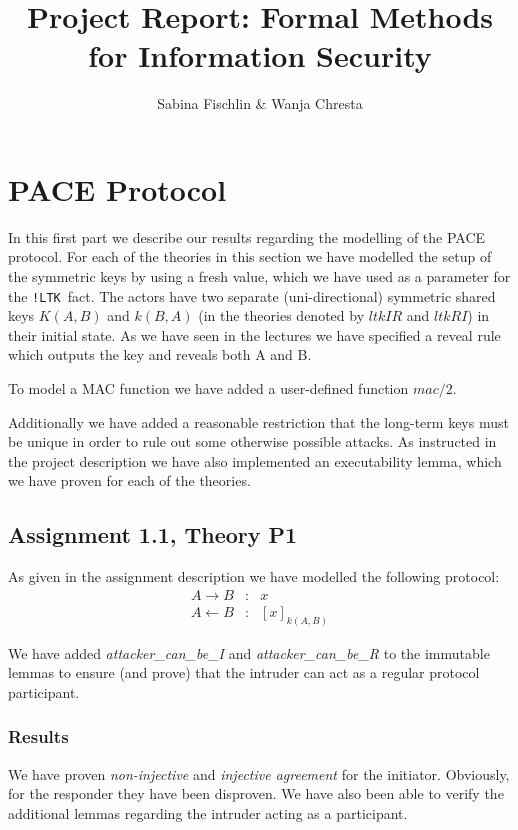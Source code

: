 \documentclass[a4paper]{article}
\title{Project Report: Formal Methods for Information Security}
\author{Sabina Fischlin \& Wanja Chresta}
\begin{document}
\maketitle

\newcommand{\Fr}{\texttt{\textasciitilde{}Fr}}
\newcommand{\LTK}{\texttt{!LTK}}

\section{PACE Protocol}
In this first part we describe our results regarding the modelling of the PACE protocol. For each of the theories in this section we have modelled the setup of the symmetric keys by using a fresh value, which we have used as a parameter for the \LTK \ fact. The actors have two separate (uni-directional) symmetric shared keys $K(A,B)$ and $k(B,A)$ (in the theories denoted by $ltkIR$ and $ltkRI$) in their initial state. As we have seen in the lectures we have specified a reveal rule which outputs the key and reveals both A and B. \par \noindent
To model a MAC function we have added a user-defined function $mac/2$. \par
Additionally we have added a reasonable restriction that the long-term keys must be unique in order to rule out some otherwise possible attacks.
As instructed in the project description we have also implemented an executability lemma, which we have proven for each of the theories.

\subsection{Assignment 1.1, Theory P1}
As given in the assignment description we have modelled the following protocol:
\begin{eqnarray*}
A \to B        & : & x\\
A \leftarrow B & : & [x]_{k(A,B)}
\end{eqnarray*}

\noindent We have added {\it attacker\_can\_be\_I} and {\it attacker\_can\_be\_R} to the immutable lemmas to ensure (and prove) that the intruder can act as a regular protocol participant.

\subsubsection*{Results}

We have proven {\em non-injective} and {\em injective agreement} for the initiator. Obviously, for the responder they have been disproven. We have also been able to verify the additional lemmas regarding the intruder acting as a participant.
\end{document}
